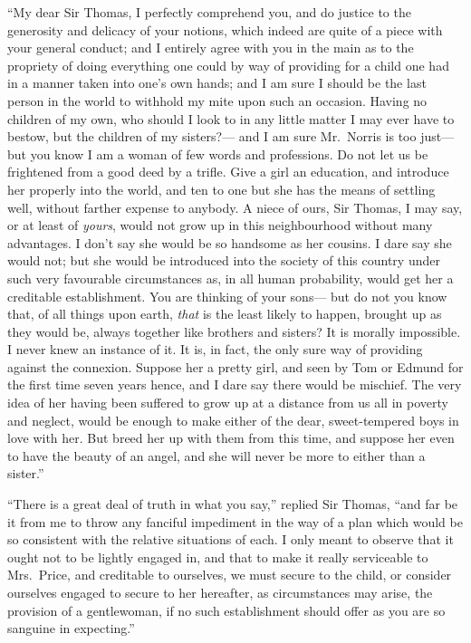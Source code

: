 \documentclass{article}
\begin{document}
``My dear Sir Thomas, I perfectly comprehend you, and do
justice to the generosity and delicacy of your notions,
which indeed are quite of a piece with your general conduct;
and I entirely agree with you in the main as to the propriety
of doing everything one could by way of providing for a
child one had in a manner taken into one's own hands;
and I am sure I should be the last person in the world to
withhold my mite upon such an occasion.  Having no children
of my own, who should I look to in any little matter I
may ever have to bestow, but the children of my sisters?---%
and I am sure Mr.\ Norris is too just---but you know I am
a woman of few words and professions.  Do not let us
be frightened from a good deed by a trifle.  Give a girl
an education, and introduce her properly into the world,
and ten to one but she has the means of settling well,
without farther expense to anybody.  A niece of ours,
Sir Thomas, I may say, or at least of \emph{yours}, would not
grow up in this neighbourhood without many advantages.
I don't say she would be so handsome as her cousins.
I dare say she would not; but she would be introduced into
the society of this country under such very favourable
circumstances as, in all human probability, would get her
a creditable establishment.  You are thinking of your sons---%
but do not you know that, of all things upon earth,
\emph{that} is the least likely to happen, brought up as they
would be, always together like brothers and sisters?
It is morally impossible.  I never knew an instance of it.
It is, in fact, the only sure way of providing against
the connexion.  Suppose her a pretty girl, and seen by Tom
or Edmund for the first time seven years hence, and I dare
say there would be mischief.  The very idea of her having
been suffered to grow up at a distance from us all in poverty
and neglect, would be enough to make either of the dear,
sweet-tempered boys in love with her.  But breed her up
with them from this time, and suppose her even to have the
beauty of an angel, and she will never be more to either than
a sister.''

``There is a great deal of truth in what you say,''
replied Sir Thomas, ``and far be it from me to throw any
fanciful impediment in the way of a plan which would be
so consistent with the relative situations of each.  I only
meant to observe that it ought not to be lightly engaged in,
and that to make it really serviceable to Mrs.\ Price,
and creditable to ourselves, we must secure to the child,
or consider ourselves engaged to secure to her hereafter,
as circumstances may arise, the provision of a gentlewoman,
if no such establishment should offer as you are so sanguine
in expecting.''
\end{document}
